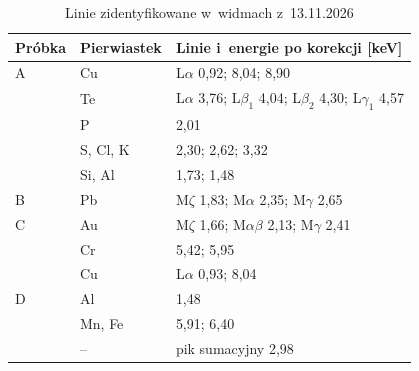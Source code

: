 \begin{table}[htbp]\centering\small
  \caption{Linie zidentyfikowane w~widmach z~13.11.2026}\label{tab:widma-probki}
  \begin{tabular}{@{}lll@{}}\toprule
    Próbka & Pierwiastek & Linie i~energie po korekcji [\si{\kilo\electronvolt}] \\\midrule
    A & Cu       & L$\alpha$ 0,92; \Ka{} 8,04; \Kb{} 8,90 \\
      & Te       & L$\alpha$ 3,76; L$\beta_1$ 4,04; L$\beta_2$ 4,30; L$\gamma_1$ 4,57 \\
      & P        & \Ka{} 2,01 \\
      & S, Cl, K & \Ka{} 2,30; 2,62; 3,32 \\
      & Si, Al   & \Ka{} 1,73; 1,48 \\\midrule
    B & Pb       & M$\zeta$ 1,83; M$\alpha$ 2,35; M$\gamma$ 2,65 \\\midrule
    C & Au       & M$\zeta$ 1,66; M$\alpha\beta$ 2,13; M$\gamma$ 2,41 \\
      & Cr       & \Ka{} 5,42; \Kb{} 5,95 \\
      & Cu       & L$\alpha$ 0,93; \Ka{} 8,04 \\\midrule
    D & Al       & \Ka{} 1,48 \\
      & Mn, Fe   & \Ka{} 5,91; 6,40 \\
      & --       & pik sumacyjny 2,98 \\\bottomrule
  \end{tabular}
\end{table}

